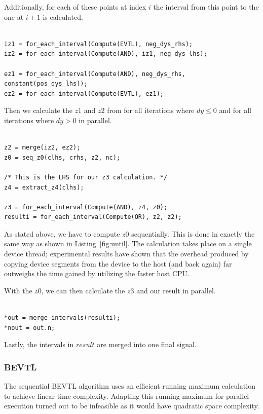 \documentclass[a4paper,10pt]{article}
\begin{document}
Additionally, for each of these points at index $i$ the interval from this point to
the one at $i+1$ is calculated.

\begin{lstlisting}

iz1 = for_each_interval(Compute(EVTL), neg_dys_rhs);
iz2 = for_each_interval(Compute(AND), iz1, neg_dys_lhs);

ez1 = for_each_interval(Compute(AND), neg_dys_rhs, constant(pos_dys_lhs));
ez2 = for_each_interval(Compute(EVTL), ez1);

\end{lstlisting}

Then we calculate the $z1$ and $z2$ from for all iterations where $dy \leq 0$ and for
all iterations where $dy > 0$ in parallel.

\begin{lstlisting}

z2 = merge(iz2, ez2);
z0 = seq_z0(clhs, crhs, z2, nc);

/* This is the LHS for our z3 calculation. */
z4 = extract_z4(clhs);

z3 = for_each_interval(Compute(AND), z4, z0);
resulti = for_each_interval(Compute(OR), z2, z2);

\end{lstlisting}

As stated above, we have to compute $z0$ sequentially. This is done in exactly the
same way as shown in Listing~\ref{fig:until}. The calculation takes place on a single
device thread; experimental results have shown that the overhead produced by
copying device segments from the device to the host (and back again) far outweighs
the time gained by utilizing the faster host CPU.

With the $z0$, we can then calculate the $z3$ and our result in parallel.

\begin{lstlisting}

*out = merge_intervals(resulti);
*nout = out.n;

\end{lstlisting}

Lastly, the intervals in $result$ are merged into one final signal.

\subsubsection{BEVTL}

The sequential BEVTL algorithm uses an efficient running maximum calculation to
achieve linear time complexity. Adapting this running maximum for parallel execution
turned out to be infeasible as it would have quadratic space complexity.
\end{document}
